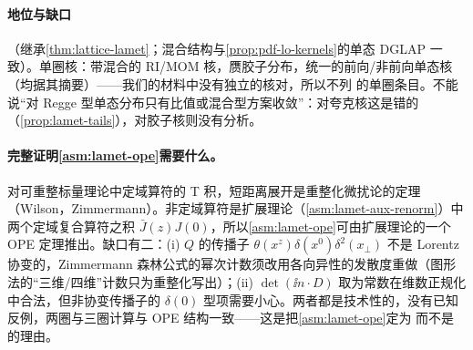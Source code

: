\paragraph{地位与缺口}
\tagA（继承\cref{thm:lattice-lamet}；混合结构与\cref{prop:pdf-lo-kernels}的单态 DGLAP 一致）。单圈核：带混合的 RI/MOM 核\cite{Wang:2019tgg}，赝胶子分布\cite{Balitsky:2019krf}，统一的前向/非前向单态核\cite{Yao:2022vtp}（均据其摘要）——我们的材料中没有独立的核对，所以不列 \tagR 的单圈条目。不能说“对 Regge 型单态分布只有比值或混合型方案收敛”：对夸克核这是错的（\cref{prop:lamet-tails}），对胶子核则没有分析。

\paragraph{完整证明\cref{asm:lamet-ope}需要什么。}
对可重整标量理论中定域算符的 T 积，短距离展开是重整化微扰论的定理（Wilson\cite{Wilson1969}，Zimmermann\cite{Zimmermann1973}）。非定域算符是扩展理论（\cref{asm:lamet-aux-renorm}）中两个定域复合算符之积 $\bar J(z)J(0)$，所以\cref{asm:lamet-ope}可由扩展理论的一个 OPE 定理推出。缺口有二：(i) $Q$ 的传播子 $\theta(x^z)\delta(x^0)\delta^2(x_\perp)$ 不是 Lorentz 协变的，Zimmermann 森林公式的幂次计数须改用各向异性的发散度重做（图形法的“三维/四维”计数只为重整化写出）；(ii) $\det(\ii n\cdot D)$ 取为常数在维数正规化中合法，但非协变传播子的 $\delta(0)$ 型项需要小心。两者都是技术性的，没有已知反例，两圈与三圈计算与 OPE 结构一致——这是把\cref{asm:lamet-ope}定为 \tagA 而不是 \tagC 的理由。
